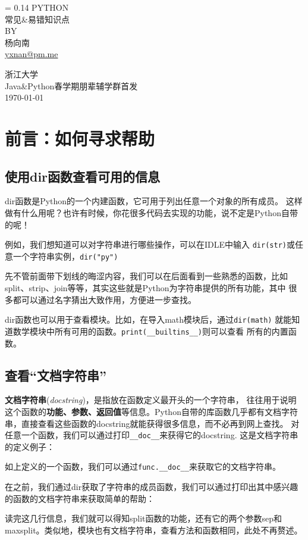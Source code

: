 \documentclass{style/ucasproposal}
\makeatletter
\newcommand{\inlinepython}[1]{\texttt{#1}}
\newlength{\drop}
\newcommand*{\titleDB}{\begingroup
	\drop = 0.14\textheight
	\centering
	\vspace*{\drop}
	{\Huge PYTHON}\\[\baselineskip]
	{\Huge 常见\&易错知识点}\\[1.5\baselineskip]
	{\LARGE BY}\\[\baselineskip]
	{\LARGE 杨向南}\\[\baselineskip]
	{\href{mailto:yxnan@pm.me}{yxnan@pm.me}}\par
	\vfill
	{浙江大学}\\[0.1\baselineskip]
	{Java\&Python春学期朋辈辅学群\quad 首发}\\[8\baselineskip]
	\vfill
	{\small\sffamily \today}\par
	\newpage
	\endgroup}
\makeatother
\begin{document}
\thispagestyle{empty}
\titleDB

\tableofcontents

\clearpage
{}
\setcounter{section}{-1}

\section{前言：如何寻求帮助}
\subsection{使用dir函数查看可用的信息}
dir函数是Python的一个内建函数，它可用于列出任意一个对象的所有成员。
这样做有什么用呢？也许有时候，你花很多代码去实现的功能，说不定是Python自带的呢！

例如，我们想知道可以对字符串进行哪些操作，可以在IDLE中输入
\inlinepython{dir(str)}或任意一个字符串实例，\inlinepython{dir("py")}


先不管前面带下划线的晦涩内容，我们可以在后面看到一些熟悉的函数，比如
split、strip、join等等，其实这些就是Python为字符串提供的所有功能，其中
很多都可以通过名字猜出大致作用，方便进一步查找。

dir函数也可以用于查看模块。比如，在导入math模块后，通过\inlinepython{dir(math)}
就能知道数学模块中所有可用的函数。\inlinepython{print(__builtins__)}则可以查看
所有的内置函数。


\subsection{查看``文档字符串''}
\textbf{文档字符串}(\textit{docstring})，是指放在函数定义最开头的一个字符串，
往往用于说明这个函数的\textbf{功能、参数、返回值}等信息。Python自带的库函数几乎都有文档字符串，直接查看这些函数的docstring就能获得很多信息，而不必再到网上查找。
对任意一个函数，我们可以通过打印\inlinepython{__doc__}来获得它的docstring.
这是文档字符串的定义例子：


如上定义的一个函数，我们可以通过\inlinepython{func.__doc__}来获取它的文档字符串。

在之前，我们通过dir获取了字符串的成员函数，我们可以通过打印出其中感兴趣的函数的文档字符串来获取简单的帮助：


读完这几行信息，我们就可以得知split函数的功能，还有它的两个参数sep和maxsplit。类似地，模块也有文档字符串，查看方法和函数相同，此处不再赘述。
\end{document}
